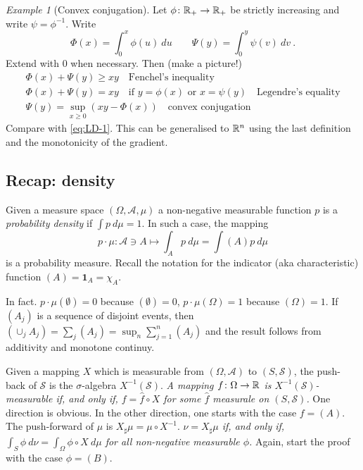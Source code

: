 \documentclass[12pt,a4paper]{amsart}
\newcommand{\one}{\bm 1}
\theoremstyle{plain}%
\theoremstyle{definition}
\theoremstyle{remark}
\newtheorem{example}{Example}
\begin{document}
\begin{example}[Convex conjugation] Let $\phi \colon \mathbb{R}_+ \to \mathbb{R}_+$ be strictly increasing and write $\psi=\phi^{-1}$. Write
\begin{equation*}
\Phi(x) = \int_0^x \phi(u) \ du  \qquad \Psi(y) = \int_0^y \psi(v) \ dv \ .
\end{equation*}
Extend with 0 when necessary. Then (make a picture!)
\begin{gather*}
    \Phi(x) + \Psi(y) \geq xy \quad \text{Fenchel's inequality}\\
    \Phi(x) + \Psi(y) = xy \quad \text{if $y = \phi(x)$ or $x = \psi(y)$} \quad \text{Legendre's equality}\\
    \Psi(y) = \sup_{x \geq 0} (xy - \Phi(x)) \quad \text{convex conjugation} 
\end{gather*}
Compare with \cref{eq:LD-1}. This can be generalised to $\mathbb{R}^n$ using the last definition and the monotonicity of the gradient.
\end{example}

\subsection{Recap: density} Given a measure space
$(\Omega,\mathcal A, \mu)$ a non-negative measurable function $p$ is a
\emph{probability density} if $\int p \ d\mu = 1$. In such a case, the
mapping
\begin{equation*}
  p \cdot \mu \colon \mathcal A \ni A \mapsto \int_A p \ d\mu = \int (A) p\ d\mu
\end{equation*}
is a probability measure. Recall the notation for the indicator (aka
characteristic) function $(A) = \one_A = \chi_A$.

In fact. $p \cdot \mu (\emptyset) = 0$ because $(\emptyset) = 0$,
$p \cdot \mu(\Omega) = 1$ because $(\Omega) = 1$. If $(A_j)$ is a
sequence of disjoint events, then
$(\cup_j A_j) = \sum_j (A_j) = \sup_n \sum_{j=1}^n (A_j)$ and the
result follows from additivity and monotone continuy.

Given a mapping $X$ which is measurable from $(\Omega,\mathcal A)$ to
$(S,\mathcal S)$, the push-back of $\mathcal S$ is the
$\sigma$-algebra $X^{-1}(\mathcal S)$. \emph{A mapping
  $f \colon \Omega \to \mathbb{R}$ is $X^{-1}(\mathcal S)$-measurable if,
  and only if, $f = \hat f \circ X$ for some $\hat f$ measurale on
  $(S,\mathcal S)$.} One direction is obvious. In the other direction,
one starts with the case $f = (A)$. The push-forward of $\mu$ is
$X_\sharp \mu = \mu \circ X^{-1}$. \emph{$\nu = X_\sharp \mu$ if, and
  only if, $\int_S \phi \ d\nu = \int_\Omega \phi \circ X \ d\mu$ for
  all non-negative measurable $\phi$.} Again, start the proof with the
case $\phi = (B)$.
\end{document}
